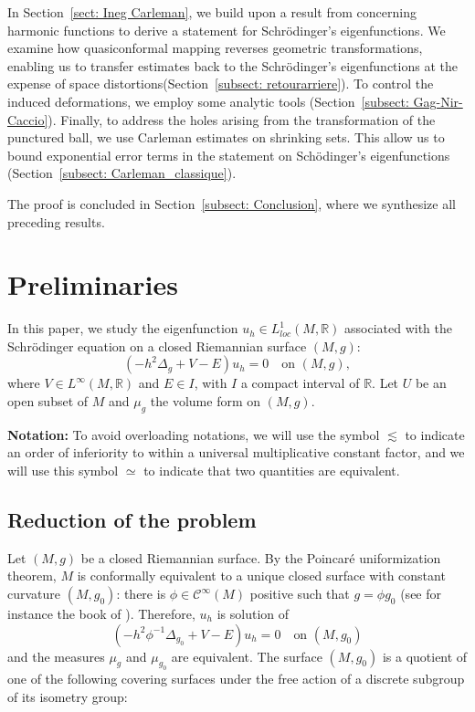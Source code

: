 \documentclass[leqno,11pt,letterpaper, english]{amsart}
\theoremstyle{plain}
\theoremstyle{definition}
\numberwithin{equation}{section}
\def\R{\mathbb R}
\begin{document}
In Section~\ref{sect: Ineg Carleman}, we build upon a result from \cite*{logunov2020landisconjectureexponentialdecay} concerning harmonic functions to derive a statement for Schr\"odinger's eigenfunctions. We examine how quasiconformal mapping reverses geometric transformations, enabling us to transfer estimates back to the Schr\"odinger's eigenfunctions at the expense of space distortions(Section~\ref{subsect: retourarriere}). To control the induced deformations, we employ some analytic tools (Section~\ref{subsect: Gag-Nir-Caccio}).  Finally, to address the holes arising from the transformation of the punctured ball, we use Carleman estimates on shrinking sets. This allow us to bound exponential error terms in the statement on Schödinger's eigenfunctions (Section~\ref{subsect: Carleman_classique}).

The proof is concluded in Section~\ref{subsect: Conclusion}, where we synthesize all preceding results.

	
\section{Preliminaries}
\label{sect: Preliminaire}
In this paper, we study the eigenfunction $u_h \in L_{loc}^1(M,\R)$ associated with the Schrödinger equation on a closed Riemannian surface $(M,g)$:
\[
(-h^2\Delta_g + V - E)u_h = 0 \quad \text{on } (M,g),
\]
where $V \in L^\infty(M, \R)$ and $E \in I$, with $I$ a compact interval of $\R$. Let $U$ be an open subset of $M$ and  $\mu_g$ the volume form on $(M,g)$.

\textbf{Notation:} To avoid overloading notations, we will use the symbol $\lesssim$ to indicate an order of inferiority to within a universal multiplicative constant factor, and we will use this symbol $\simeq$ to indicate that two quantities are equivalent. 

\subsection{Reduction of the problem}
\label{subsect: Uniformization}
Let $(M,g)$ be a closed Riemannian surface. By the Poincaré uniformization theorem, $M$ is conformally equivalent to a unique closed surface with constant curvature $(M,g_0)$: there is $\phi \in \mathcal{C}^\infty(M)$ positive such that $g=\phi g_0$ (see for instance the book of \cite{de2016uniformization}). Therefore, $u_h$ is solution of
\[
(-h^2\phi^{-1}\Delta_{g_0} + V - E)u_h = 0 \quad \text{on } (M,g_0)
\]
and the measures $\mu_g$ and $\mu_{g_0}$ are equivalent.
The surface $(M,g_0)$ is a quotient of one of the following covering surfaces under the free action of a discrete subgroup of its isometry group:
\end{document}
